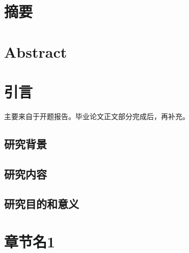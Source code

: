 \documentclass[zihao=-4,openany]{ctexbook}
\begin{document}
	
	
	
	
	\chapter*{摘要}
	\thispagestyle{fancy} %
	
	\zhlipsum[1]
	
	\chapter*{Abstract}
	\thispagestyle{fancy} %
	
	\lipsum[1]
	
	\tableofcontents  %
	\thispagestyle{fancy} %
	
	\chapter{引言}
	\thispagestyle{fancy} %
	
	主要来自于开题报告。毕业论文正文部分完成后，再补充。
	
	
	\section{研究背景}\indent

	\zhlipsum[1-3]
	
	\section{研究内容}\indent
	
	\zhlipsum[1-3]
	
	\section{研究目的和意义}\indent
	
	\zhlipsum[1-3]
	
	\chapter{章节名1}
	\thispagestyle{fancy} %
	
\end{document}
